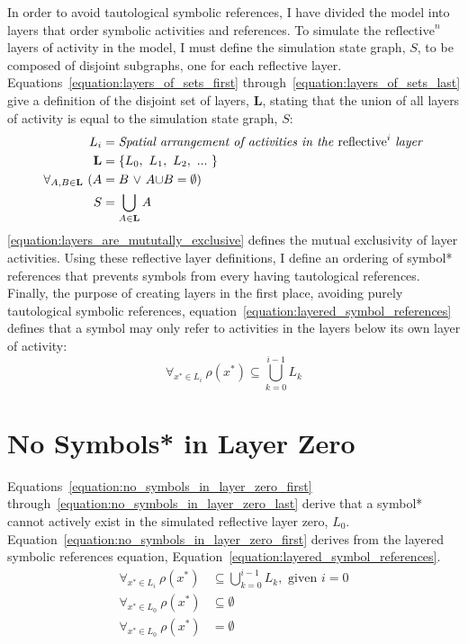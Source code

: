 In order to avoid tautological symbolic references, I have divided the
model into layers that order symbolic activities and references.  To
simulate the $\text{reflective}^n$ layers of activity in the model, I
must define the simulation state graph, $S$, to be composed of
disjoint subgraphs, one for each reflective layer.
Equations~\ref{equation:layers_of_sets_first}
through~\ref{equation:layers_of_sets_last} give a definition of the
disjoint set of layers, $\mathbf{L}$, stating that the union of all
layers of activity is equal to the simulation state graph, $S$:
\begin{align}
\label{equation:layers_of_sets_first}
                            L_i &= \text{\emph{Spatial arrangement of activities in the} }\text{reflective}^i\text{ \emph{layer}} \\
                     \mathbf{L} &= \{L_0, ~L_1, ~L_2, ~...~ \} \\
\label{equation:layers_are_mututally_exclusive}
\forall_{A,B{\in}{\mathbf{L}}} ~ (A &= B ~{\vee}~ A{\cup}B = {\emptyset}) \\
\label{equation:layers_of_sets_last}
                              S &= \bigcup_{A{\in}\mathbf{L}}{A}
\end{align}
{\mbox{\autoref{equation:layers_are_mututally_exclusive}}} defines the
mutual exclusivity of layer activities.  Using these reflective layer
definitions, I define an ordering of symbol* references that prevents
symbols from every having tautological references.  Finally, the
purpose of creating layers in the first place, avoiding purely
tautological symbolic references,
equation~\ref{equation:layered_symbol_references} defines that a
symbol may only refer to activities in the layers below its own layer
of activity:
\begin{equation}
\label{equation:layered_symbol_references}
\forall_{x^* \in L_i}~\rho(x^*) \subseteq \bigcup_{k=0}^{i-1}{L_k}
\end{equation}

\section{No Symbols* in Layer Zero}

Equations~\ref{equation:no_symbols_in_layer_zero_first}
through~\ref{equation:no_symbols_in_layer_zero_last} derive that a
symbol* cannot actively exist in the simulated reflective layer zero,
$L_0$.  Equation~\ref{equation:no_symbols_in_layer_zero_first} derives
from the layered symbolic references equation,
Equation~\ref{equation:layered_symbol_references}.
\begin{align}
\label{equation:no_symbols_in_layer_zero_first}
\forall_{x^* \in L_i}~\rho(x^*) &\subseteq \bigcup_{k=0}^{i-1}{L_k}, \text{~given~} i=0 \\
\forall_{x^* \in L_0}~\rho(x^*) &\subseteq \emptyset \\
\label{equation:no_symbols_in_layer_zero_last}
\forall_{x^* \in L_0}~\rho(x^*) &= \emptyset
\end{align}







